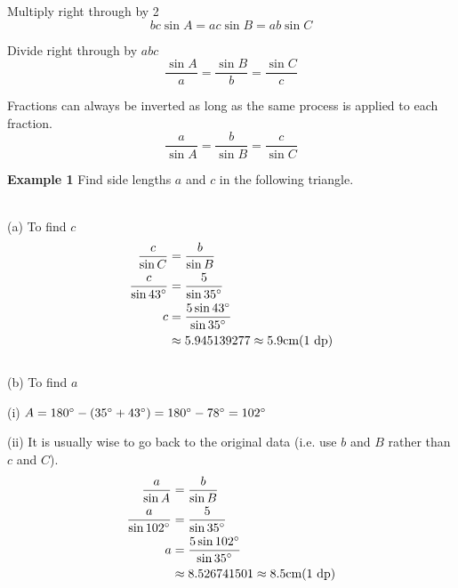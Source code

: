 Multiply right through by 2
\begin{equation*}b c \sin  A =a c \sin  B =a b \sin  C
\end{equation*}

Divide right through by $a b c$
\begin{equation*}\frac{\sin  A}{a} =\frac{\sin  B}{b} =\frac{\sin  C}{c}
\end{equation*}

Fractions can always be inverted as long as the same process is applied to each fraction.
\begin{equation*}\frac{a}{\sin  A} =\frac{b}{\sin  B} =\frac{c}{\sin  C}
\end{equation*}

\textbf{Example 1} Find side lengths $a$ and $c$ in the following triangle.

\setlength\fboxrule{0in}\setlength\fboxsep{0.2in}
\\\relax (a) To find $c$
\begin{align*}\frac{c}{\sin  C} &  = \frac{b}{\sin  B} \\
\frac{c}{\sin  43 \mbox{{\ensuremath{{}^\circ}}}} &  = \frac{5}{\sin  35 \mbox{{\ensuremath{{}^\circ}}}} \\
c &  = \frac{5 \sin  43 \mbox{{\ensuremath{{}^\circ}}}}{\sin  35 \mbox{{\ensuremath{{}^\circ}}}} \\
&  \approx   5.945139277 \approx 5.9 \mbox{cm}\text{(1 dp)}\end{align*} \\\relax (b) To find $a$ 

(i) $A =180 \mbox{{\ensuremath{{}^\circ}}} -(35 \mbox{{\ensuremath{{}^\circ}}} +43 \mbox{{\ensuremath{{}^\circ}}}) =180 \mbox{{\ensuremath{{}^\circ}}} -78 \mbox{{\ensuremath{{}^\circ}}} =102 \mbox{{\ensuremath{{}^\circ}}}$ 

(ii) It is usually wise to go back to the original data (i.e. use $b$ and $B$ rather than $c$ and $C$).
\begin{align*}\frac{a}{\sin  A} &  = \frac{b}{\sin  B} \\
\frac{a}{\sin  102 \mbox{{\ensuremath{{}^\circ}}}} &  = \frac{5}{\sin  35 \mbox{{\ensuremath{{}^\circ}}}} \\
a &  = \frac{5 \sin  102 \mbox{{\ensuremath{{}^\circ}}}}{\sin  35 \mbox{{\ensuremath{{}^\circ}}}} \\
&  \approx   8.526741501 \approx 8.5 \mbox{cm}\text{(1 dp)}\end{align*}

